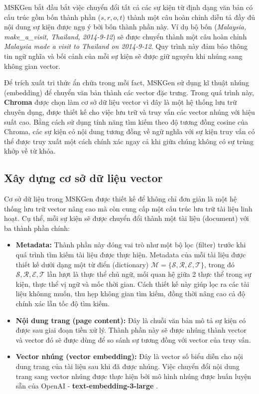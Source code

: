 MSKGen bắt đầu bắt việc chuyển đổi tất cả các sự kiện từ định dạng văn bản có cấu trúc gồm bốn thành phần ($s, r, o, t$) thành một câu hoàn chỉnh diễn tả đầy đủ nội dung sự kiện được ngụ ý bởi bốn thành phần này. Ví dụ bộ bốn (\textit{Malaysia, make\_a\_visit, Thailand, 2014-9-12}) sẽ được chuyển thành một câu hoàn chỉnh \textit{Malaysia made a visit to Thailand on 2014-9-12}. Quy trình này đảm bảo thông tin ngữ nghĩa và bối cảnh của mỗi sự kiện sẽ được giữ nguyên khi nhúng sang không gian vector.

Để trích xuất tri thức ẩn chứa trong mỗi fact, MSKGen sử dụng kĩ thuật nhúng (embedding) để chuyển văn bản thành các vector đặc trưng. Trong quá trình này, \textbf{Chroma} được chọn làm cơ sở dữ liệu vector vì đây là một hệ thống lưu trữ chuyên dụng, được thiết kế cho việc lưu trữ và truy vấn các vector nhúng với hiệu suất cao. Bằng cách sử dụng tính năng tìm kiếm theo độ tương đồng cosine của Chroma, các sự kiện có nội dung tương đồng về ngữ nghĩa với sự kiện truy vấn có thể được truy xuất một cách chính xác ngay cả khi giữa chúng không có sự trùng khớp về từ khóa.

\vspace{1em}
\subsection{Xây dựng cơ sở dữ liệu vector}

Cơ sở dữ liệu trong MSKGen được thiết kế để không chỉ đơn giản là một hệ thống lưu trữ vector nâng cao mà còn cung cấp một cấu trúc lưu trữ tài liệu linh hoạt. Cụ thể, mỗi sự kiện sẽ được chuyển đổi thành một tài liệu (document) với ba thành phần chính:
\begin{itemize}
    \item \textbf{Metadata:} Thành phần này đóng vai trò như một bộ lọc (filter) trước khi quá trình tìm kiếm tài liệu được thực hiện. Metadata của mỗi tài liệu được thiết kế dưới dạng một từ điển (dictionary) $\mathcal{M} = \{\mathcal{S, R, E, T}\}$, trong đó $\mathcal{S, R, E, T}$ lần lượt là thực thể chủ ngữ, mối quan hệ giữa 2 thực thể trong sự kiện, thực thể vị ngữ và mốc thời gian. Cách thiết kế này giúp lọc ra các tài liệu khônng muốn, thu hẹp không gian tìm kiếm, đồng thời nâng cao cả độ chính xác lẫn tốc độ tìm kiếm.
    \item \textbf{Nội dung trang (page content):} Đây là chuỗi văn bản mô tả sự kiện có được sau giai đoạn tiền xử lý. Thành phần này sẽ được nhúng thành vector và vector đó sẽ được dùng để so sánh sự tương đồng với vector của truy vấn.
    \item \textbf{Vector nhúng (vector embedding):} Đây là vector số biểu diễn cho nội dung trang của tài liệu sau khi đã được nhúng. Việc chuyển đổi nội dung trang sang vector nhúng được thực hiện bởi mô hình nhúng được huấn luyện sẵn của OpenAI - \textbf{text-embedding-3-large} \cite{ref_article18}.
\end{itemize}

